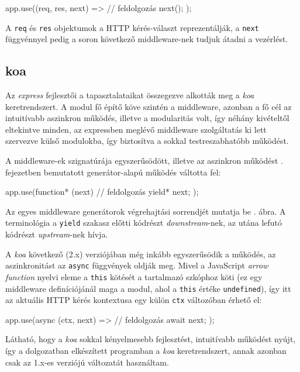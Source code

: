 \begin{js}
app.use((req, res, next) => {
  // feldolgozás
  next();
});
\end{js}

A \texttt{req} és \texttt{res} objektumok a HTTP kérés-választ reprezentálják, a
\texttt{next} függvénnyel pedig a soron következő middleware-nek tudjuk átadni a
vezérlést.

\subsection{koa}

Az \emph{express} fejlesztői a tapasztalataikat összegezve alkották meg a
\emph{koa} keretrendszert. A modul fő építő köve szintén a middleware, azonban a
fő cél az intuitívabb aszinkron működés, illetve a modularitás volt, így néhány
kivételtől eltekintve minden, az expressben meglévő middleware szolgáltatás ki
lett szervezve külső modulokba, így biztosítva a sokkal testreszabhatóbb
működést.

A middleware-ek szignatúrája egyszerűsödött, illetve az aszinkron működést
. fejezetben bemutatott generátor-alapú működés váltotta fel:

\begin{js}
app.use(function* (next) {
  // feldolgozás
  yield* next;
});
\end{js}

Az egyes middleware generátorok végrehajtási sorrendjét mutatja be
. ábra. A terminológia a \texttt{yield} szakasz előtti kódrészt
\emph{downstream}-nek, az utána lefutó kódrészt \emph{upstream}-nek hívja.


A \emph{koa} következő (2.x) verziójában még inkább egyszerűsödik a működés, az
aszinkronitást az \texttt{async} függvények oldják meg. Mivel a JavaScript
\emph{arrow function} nyelvi eleme a \texttt{this} kötését a tartalmazó szkóphoz
köti (ez egy middleware definíciójánál maga a modul, ahol a \texttt{this} értéke
\texttt{undefined}), így itt az aktuális HTTP kérés kontextusa egy külön
\texttt{ctx} változóban érhető el:

\begin{js}
app.use(async (ctx, next) => {
  // feldolgozás
  await next;
});
\end{js}

Látható, hogy a \emph{koa} sokkal kényelmesebb fejlesztést, intuitívabb működést
nyújt, így a dolgozatban elkészített programban a \emph{koa} keretrendszert,
annak azonban csak az 1.x-es verziójú változatát használtam.

